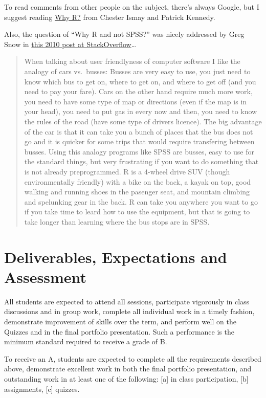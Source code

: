 \documentclass[
]{book}
\begin{document}
To read comments from other people on the subject, there's always Google, but I suggest reading \href{https://rbasics.netlify.com/2-whyr}{Why R?} from Chester Ismay and Patrick Kennedy.

Also, the question of ``Why R and not SPSS?'' was nicely addressed by Greg Snow in \href{https://stackoverflow.com/questions/3787231/r-and-spss-difference}{this 2010 post at StackOverflow}\ldots{}

\begin{quote}
When talking about user friendlyness of computer software I like the analogy of cars vs.~busses: Busses are very easy to use, you just need to know which bus to get on, where to get on, and where to get off (and you need to pay your fare). Cars on the other hand require much more work, you need to have some type of map or directions (even if the map is in your head), you need to put gas in every now and then, you need to know the rules of the road (have some type of drivers licence). The big advantage of the car is that it can take you a bunch of places that the bus does not go and it is quicker for some trips that would require transfering between busses. Using this analogy programs like SPSS are busses, easy to use for the standard things, but very frustrating if you want to do something that is not already preprogrammed. R is a 4-wheel drive SUV (though environmentally friendly) with a bike on the back, a kayak on top, good walking and running shoes in the pasenger seat, and mountain climbing and spelunking gear in the back. R can take you anywhere you want to go if you take time to leard how to use the equipment, but that is going to take longer than learning where the bus stops are in SPSS.
\end{quote}

\hypertarget{deliverables-expectations-and-assessment}{%
\chapter{Deliverables, Expectations and Assessment}\label{deliverables-expectations-and-assessment}}

All students are expected to attend all sessions, participate vigorously in class discussions and in group work, complete all individual work in a timely fashion, demonstrate improvement of skills over the term, and perform well on the Quizzes and in the final portfolio presentation. Such a performance is the minimum standard required to receive a grade of B.

To receive an A, students are expected to complete all the requirements described above, demonstrate excellent work in both the final portfolio presentation, and outstanding work in at least one of the following: {[}a{]} in class participation, {[}b{]} assignments, {[}c{]} quizzes.
\end{document}

